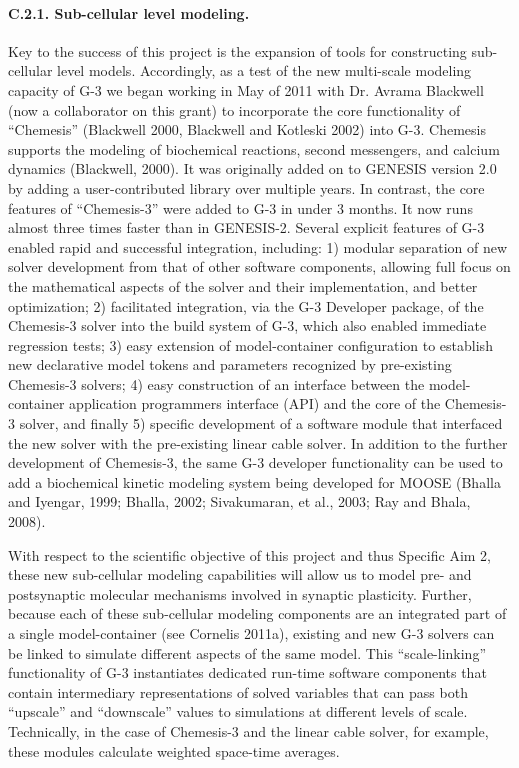 \documentclass[12pt]{article}
\begin{document}
\paragraph{C.2.1. Sub-cellular level modeling.} Key to the success of this project is the expansion of tools for constructing sub-cellular level models. Accordingly, as a test of the new multi-scale modeling capacity of G-3 we began working in May of 2011 with Dr. Avrama Blackwell (now a collaborator on this grant) to incorporate the core functionality of ``Chemesis'' (Blackwell 2000, Blackwell and Kotleski 2002) into G-3. Chemesis supports the modeling of biochemical reactions, second messengers, and calcium dynamics (Blackwell, 2000). It was originally added on to GENESIS version 2.0 by adding a user-contributed library over multiple years. In contrast, the core features of ``Chemesis-3'' were added to G-3 in under 3 months. It now runs almost three times faster than in GENESIS-2. Several explicit features of G-3 enabled rapid and successful integration, including: 1) modular separation of new solver development from that of other software components, allowing full focus on the mathematical aspects of the solver and their implementation, and better optimization; 2) facilitated integration, via the G-3 Developer package, of the Chemesis-3 solver into the build system of G-3, which also enabled immediate regression tests; 3) easy extension of model-container configuration to establish new declarative model tokens and parameters recognized by pre-existing Chemesis-3 solvers; 4) easy construction of an interface between the model-container application programmers interface (API) and the core of the Chemesis-3 solver, and finally 5) specific development of a software module that interfaced the new solver with the pre-existing linear cable solver. In addition to the further development of Chemesis-3, the same G-3 developer functionality can be used to add a biochemical kinetic modeling system being developed for MOOSE (Bhalla and Iyengar, 1999; Bhalla, 2002; Sivakumaran, et al., 2003; Ray and Bhala, 2008).

With respect to the
scientific objective of this project and thus Specific Aim 2, these
new sub-cellular modeling capabilities will allow us to model pre- and
postsynaptic molecular mechanisms involved in synaptic plasticity.
Further, because each of these sub-cellular modeling components are an
integrated part of a single model-container (see Cornelis 2011a),
existing and new G-3 solvers can be linked to simulate
different aspects of the same model. This ``scale-linking''
functionality of G-3 instantiates dedicated run-time software
components that contain intermediary representations of solved
variables that can pass both ``upscale'' and ``downscale'' values to
simulations at different levels of scale.  Technically, in the case of
Chemesis-3 and the linear cable solver, for example, these modules
calculate weighted space-time averages.
\end{document}
